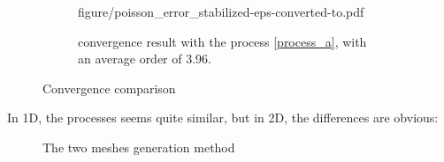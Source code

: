 \documentclass[a4paper,10pt]{article}
\begin{document}
\begin{figure}[hp!]
\begin{subfigure}[t]{0.45\textwidth}
{figure/poisson_error_stabilized-eps-converted-to.pdf}
 \caption{convergence result with the process \ref{process_a}, with an average 
order of 3.96. }
\end{subfigure}
\caption{Convergence comparison}
\end{figure}

In 1D, the processes seems quite similar, but in 2D, the differences are 
obvious:

\begin{figure}[hp!]

\caption{The two meshes generation method}
\end{figure}
\begin{table}[hp!]
\centering
\caption{Convergence table}
\label{tab:my-table}
\end{table}
\end{document}
